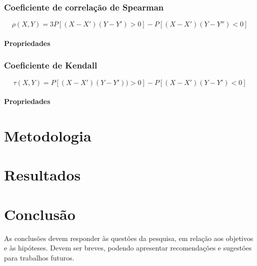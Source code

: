 \documentclass[
	12pt,				%
	oneside,			%
	a4paper,			%
	chapter=TITLE,		%
	section=TITLE,		%
	english,			%
	brazil				%
	]{abntex2}
\begin{document}
\subsection{Coeficiente de correlação de
Spearman}\label{coeficiente-de-correlauxe7uxe3o-de-spearman}

\[\rho(X, Y ) = 3P[(X - X')(Y - Y') > 0] - P[(X - X')(Y - Y'' ) < 0]\]

\subsubsection{Propriedades}\label{propriedades-1}

\subsection{Coeficiente de Kendall}\label{coeficiente-de-kendall}

\[\tau(X, Y ) = P[(X - X')(Y - Y')) > 0] - P[(X - X')(Y - Y') < 0]\]

\subsubsection{Propriedades}\label{propriedades-2}

\hypertarget{metodologia}{\chapter{Metodologia}\label{metodologia}}

\hypertarget{resultados}{\chapter{Resultados}\label{resultados}}

\hypertarget{conclusao}{\chapter{Conclusão}\label{conclusao}}

As conclusões devem responder às questões da pesquisa, em relação aos
objetivos e às hipóteses. Devem ser breves, podendo apresentar
recomendações e sugestões para trabalhos futuros.

\postextual

\begingroup

\printbibliography[title=REFERÊNCIAS]

\endgroup

\end{document}
